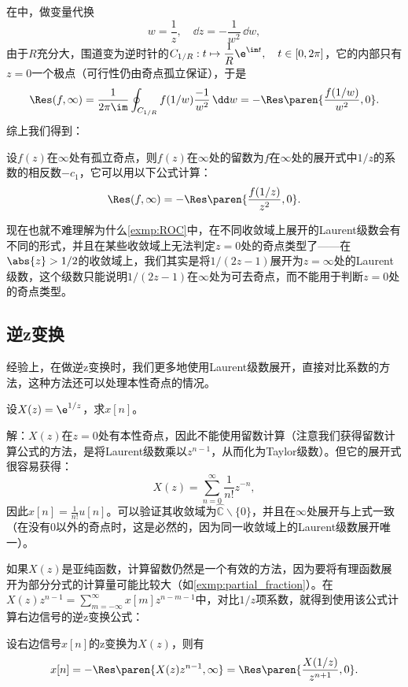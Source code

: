 在中，做变量代换
\begin{equation}
    w=\frac{1}{z},\quad \dd z=-\frac{1}{w^2}\,\dd w,
\end{equation}
由于$R$充分大，围道变为逆时针的$\displaystyle C_{1/R}:t\mapsto\frac{1}{R}\e^{\im t},\quad t\in[0,2\pi]$，它的内部只有$z=0$一个极点（可行性仍由奇点孤立保证），于是
\begin{equation}
    \Res(f,\infty)=\frac{1}{2\pi\im}\oint_{C_{1/R}}f(1/w)\frac{-1}{w^2}\,\dd w=-\Res\paren{\frac{f(1/w)}{w^2},0}.
\end{equation}
综上我们得到：
\begin{proposition}[无穷远点的留数]
    设$f(z)$在$\infty$处有孤立奇点，则$f(z)$在$\infty$处的留数为$f$在$\infty$处的展开式中$1/z$的系数的相反数$-c_1$，它可以用以下公式计算：
    \begin{equation}
        \Res(f,\infty)=-\Res\paren{\frac{f(1/z)}{z^2},0}.
    \end{equation}
\end{proposition}

现在也就不难理解为什么\cref{exmp:ROC}中，在不同收敛域上展开的Laurent级数会有不同的形式，并且在某些收敛域上无法判定$z=0$处的奇点类型了——在$\abs{z}>1/2$的收敛域上，我们其实是将$1/(2z-1)$展开为$z=\infty$处的Laurent级数，这个级数只能说明$1/(2z-1)$在$\infty$处为可去奇点，而不能用于判断$z=0$处的奇点类型。

\subsection{逆z变换}\label{sub:z_inverse}
经验上，在做逆z变换时，我们更多地使用Laurent级数展开，直接对比系数的方法，这种方法还可以处理本性奇点的情况。
\begin{example}
    设$X(z)=\e^{1/z}$，求$x[n]$。

    解：$X(z)$在$z=0$处有本性奇点，因此不能使用留数计算（注意我们获得留数计算公式的方法，是将Laurent级数乘以$z^{n-1}$，从而化为Taylor级数）。但它的展开式很容易获得：
    \begin{equation}
        X(z)=\sum_{n=0}^{\infty}\frac{1}{n!}z^{-n},
    \end{equation}
    因此$\displaystyle x[n]=\frac{1}{n!}u[n]$。可以验证其收敛域为$\hat{\mathbb{C}}\backslash\{0\}$，并且在$\infty$处展开与上式一致（在没有$0$以外的奇点时，这是必然的，因为同一收敛域上的Laurent级数展开唯一）。
\end{example}

如果$X(z)$是亚纯函数，计算留数仍然是一个有效的方法，因为要将有理函数展开为部分分式的计算量可能比较大（如\cref{exmp:partial_fraction}）。在$X(z)z^{n-1}=\sum_{m=-\infty}^{\infty}x[m]z^{n-m-1}$中，对比$1/z$项系数，就得到使用该公式计算右边信号的逆z变换公式：
\begin{theorem}
    设右边信号$x[n]$的z变换为$X(z)$，则有
    \begin{equation}
        x[n]=-\Res\paren{X(z)z^{n-1},\infty}=\Res\paren{\frac{X(1/z)}{z^{n+1}},0}.
    \end{equation}
\end{theorem}

